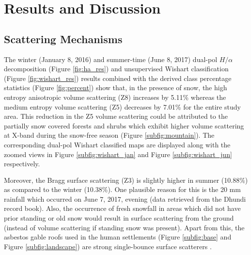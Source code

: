 \documentclass[12pt]{elsarticle}
\numberwithin{equation}{section}
\numberwithin{figure}{section}
\numberwithin{table}{section}
\begin{document}
\section{Results and Discussion}
\label{sec:res}
\subsection{Scattering Mechanisms}
\label{ssec:scat}

The winter (January 8, 2016) and summer-time (June 8, 2017) dual-pol $H/{\alpha}$ decomposition (Figure \ref{fig:ha_res}) and unsupervised Wishart classification (Figure \ref{fig:wishart_res}) results combined with the derived class percentage statistics (Figure \ref{fig:percent}) show that, in the presence of snow, the high entropy anisotropic volume scattering (Z8) increases by 5.11\% whereas the medium entropy volume scattering (Z5) decreases by 7.01\% for the entire study area. This reduction in the Z5 volume scattering could be attributed to the partially snow covered forests and shrubs which exhibit higher volume scattering at X-band during the snow-free season (Figure \ref{subfig:mountain}). The corresponding dual-pol Wishart classified maps are displayed along with the zoomed views in Figure \ref{subfig:wishart_jan} and Figure \ref{subfig:wishart_jun} respectively.

Moreover, the Bragg surface scattering (Z3) is slightly higher in summer (10.88\%) as compared to the winter (10.38\%). One plausible reason for this is the 20 mm rainfall which occurred on June 7, 2017, evening (data retrieved from the Dhundi record book). Also, the occurrence of fresh snowfall in areas which did not have prior standing or old snow would result in surface scattering from the ground (instead of volume scattering if standing snow was present)\citep{Leinss2014}. Apart from this, the asbestos gable roofs used in the human settlements (Figure \ref{subfig:base} and Figure \ref{subfig:landscape}) are strong single-bounce surface scatterers \citep{Brunner2009}. 
\end{document}
